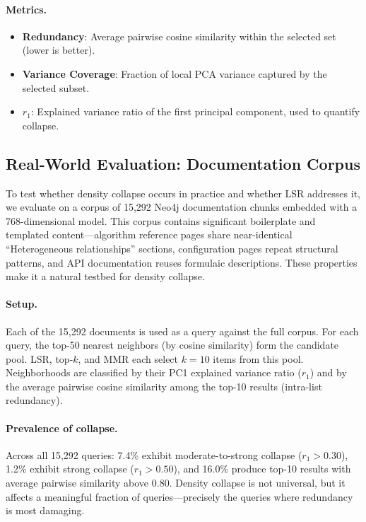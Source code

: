 \documentclass{article}
\begin{document}
\paragraph{Metrics.}
\begin{itemize}
    \item \textbf{Redundancy}: Average pairwise cosine similarity within the selected set (lower is better).
    \item \textbf{Variance Coverage}: Fraction of local PCA variance captured by the selected subset.
    \item \textbf{$r_1$}: Explained variance ratio of the first principal component, used to quantify collapse.
\end{itemize}

\subsection{Real-World Evaluation: Documentation Corpus}

To test whether density collapse occurs in practice and whether LSR addresses it, we evaluate on a corpus of 15,292 Neo4j documentation chunks embedded with a 768-dimensional model. This corpus contains significant boilerplate and templated content---algorithm reference pages share near-identical ``Heterogeneous relationships'' sections, configuration pages repeat structural patterns, and API documentation reuses formulaic descriptions. These properties make it a natural testbed for density collapse.

\paragraph{Setup.} Each of the 15,292 documents is used as a query against the full corpus. For each query, the top-50 nearest neighbors (by cosine similarity) form the candidate pool. LSR, top-$k$, and MMR each select $k = 10$ items from this pool. Neighborhoods are classified by their PC1 explained variance ratio ($r_1$) and by the average pairwise cosine similarity among the top-10 results (intra-list redundancy).

\paragraph{Prevalence of collapse.} Across all 15,292 queries: 7.4\% exhibit moderate-to-strong collapse ($r_1 > 0.30$), 1.2\% exhibit strong collapse ($r_1 > 0.50$), and 16.0\% produce top-10 results with average pairwise similarity above 0.80. Density collapse is not universal, but it affects a meaningful fraction of queries---precisely the queries where redundancy is most damaging.
\end{document}
